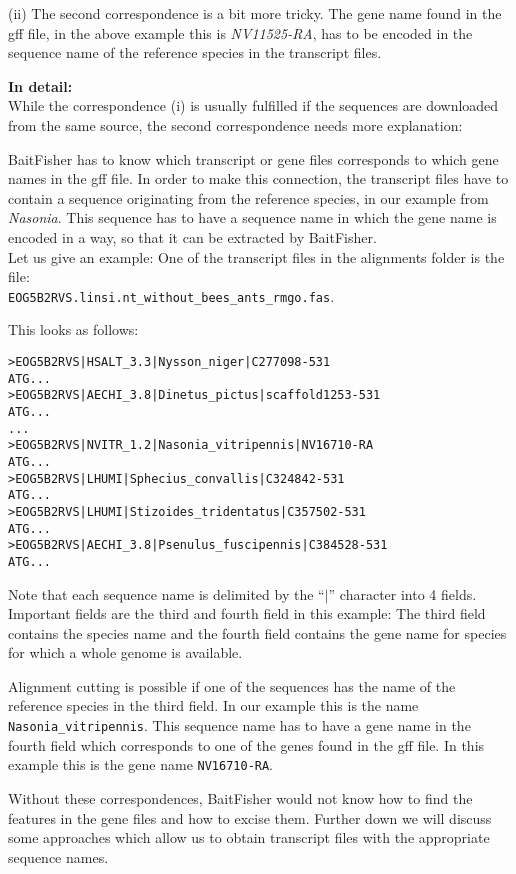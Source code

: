 \documentclass[a4paper,pdflatex,11pt]{article}
\begin{document}
(ii) The second correspondence is a bit more tricky. The gene name found in the gff file,
in the above example this is {\it NV11525-RA}, has to be encoded in the sequence name of the reference
species in the transcript files.

{\bf In detail:}\\
While the correspondence (i) is usually fulfilled if the sequences are downloaded from the same source,
the second correspondence needs more explanation:

BaitFisher has to know which transcript or gene files corresponds to which
gene names in the gff file. In order to make this connection, the transcript files have to contain
a sequence originating from the reference species, in our example from {\it Nasonia}.
This sequence has to have a sequence name in which
the gene name is encoded in a way, so that it can be extracted by BaitFisher.\\

Let us give an example:
One of the transcript files in the alignments folder is the file:\\
\verb+EOG5B2RVS.linsi.nt_without_bees_ants_rmgo.fas+.

This looks as follows:
\begin{verbatim}
>EOG5B2RVS|HSALT_3.3|Nysson_niger|C277098-531
ATG...
>EOG5B2RVS|AECHI_3.8|Dinetus_pictus|scaffold1253-531
ATG...
...
>EOG5B2RVS|NVITR_1.2|Nasonia_vitripennis|NV16710-RA
ATG...
>EOG5B2RVS|LHUMI|Sphecius_convallis|C324842-531
ATG...
>EOG5B2RVS|LHUMI|Stizoides_tridentatus|C357502-531
ATG...
>EOG5B2RVS|AECHI_3.8|Psenulus_fuscipennis|C384528-531
ATG...
\end{verbatim}

Note that each sequence name is delimited by the ``$|$'' character into 4 fields.
Important fields are the third and fourth field in this example: The third field contains
the species name and the fourth field contains the gene name for species for which a whole genome is
available.

Alignment cutting is possible if one of the sequences has the name of the reference species
in the third field. In our example this is the name \verb+Nasonia_vitripennis+.
This sequence name has to have a gene name in the fourth field which corresponds to one of the
genes found in the gff file. In this example this is the gene name \verb+NV16710-RA+.

Without these correspondences, BaitFisher would not know how to find the features in the gene files
and how to excise them. Further down we will discuss some approaches which allow us to obtain transcript files with the
appropriate sequence names.
\end{document}
